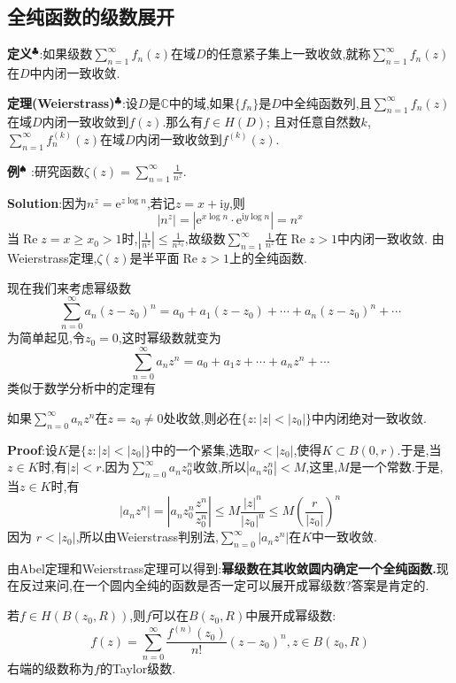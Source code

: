 \subsection{全纯函数的级数展开}
\textbf{定义}$^\clubsuit$:如果级数$\sum^{\infty}_{n=1}f_n(z)$在域$D$的任意紧子集上一致收敛,就称$\sum^{\infty}_{n=1}f_n(z)$在$D$中内闭一致收敛.\par
\textbf{定理(Weierstrass)}$^\clubsuit$:设$D$是$\mathbb{C}$中的域,如果$\{f_n\}$是$D$中全纯函数列,且$\sum^{\infty}_{n=1}f_n(z)$在域$D$内闭一致收敛到$f(z)$.那么有$f\in H(D)$;
且对任意自然数$k$,$\sum^{\infty}_{n=1}f_n^{(k)}(z)$在域$D$内闭一致收敛到$f^{(k)}(z)$.\par
\textbf{例}$^\spadesuit$ :研究函数$\zeta(z)=\sum_{n=1}^{\infty}\frac{1}{n^{z}}$.\par 
\textbf{Solution}:因为$n^z=\mathrm{e}^{z\log n}$,若记$z=x+\mathrm{i}y$,则
$$
|n^{z}|=|\mathrm{e}^{x\log n}\cdot\mathrm{e}^{\mathrm{i}y\log n}|=n^{x}
$$
当$\operatorname{Re}z=x\geqslant x_{0}>1$时,$\left|\frac{1}{n^{z}}\right|\leqslant\frac{1}{n^{x_{0}}}$,故级数$\sum_{n=1}^{\infty}\frac{1}{n^{z}}$在$\operatorname{Re}z>1$中内闭一致收敛.
由Weierstrass定理,$\zeta(z)$是半平面$\operatorname{Re}z>1$上的全纯函数.\par
现在我们来考虑幂级数
$$
\sum^{\infty}_{n=0}a_n(z-z_0)^n=a_0+a_1(z-z_0)+\cdots+a_n(z-z_0)^n+\cdots
$$
为简单起见,令$z_0=0$,这时幂级数就变为
$$
\sum^{\infty}_{n=0}a_n z^n=a_0+a_1 z+\cdots+a_n z^n+\cdots
$$
类似于数学分析中的定理有
\begin{tcolorbox}[colback=KuangNei,colframe=BianKuang,title=\textbf{Abel},sharpish corners]
    如果$\sum^{\infty}_{n=0}a_n z^n$在$z=z_0\neq 0$处收敛,则必在$\{z:|z|<|z_0|\}$中内闭绝对一致收敛.
\end{tcolorbox}
\textbf{Proof}:设$K$是$\{z:|z|<|z_0|\}$中的一个紧集,选取$r<|z_0|$,使得$K\subset B(0,r)$.于是,当$z\in K$时,有$|z|<r$.因为$\sum_{n=0}^{\infty}a_nz_0^n$收敛,所以$|a_nz_0^n|<M$,这里,$M$是一个常数.于是,当$z\in K$时,有
$$
|a_nz^n|=\left|a_nz_0^n\frac{z^n}{z_0^n}\right|\leqslant M\frac{|z|^n}{|z_0|^n}\leqslant M\left(\frac r{|z_0|}\right)^n
$$
因为 $r<|z_0|$,所以由Weierstrass判别法,$\sum_{n=0}^{\infty}|a_nz^n|$在$K$中一致收敛.\par
由Abel定理和Weierstrass定理可以得到:\textbf{幂级数在其收敛圆内确定一个全纯函数.}现在反过来问,在一个圆内全纯的函数是否一定可以展开成幂级数?答案是肯定的.
\begin{tcolorbox}[colback=KuangNei,colframe=BianKuang,title=\textbf{全纯函数的Taylor展开},sharpish corners]
若$f\in H(B(z_0,R))$,则$f$可以在$B(z_0,R)$中展开成幂级数:
\begin{equation}
    f(z)=\sum_{n=0}^{\infty}\frac{f^{(n)}(z_0)}{n!}(z-z_0)^n, z\in B(z_0,R) \label{eq:4.3.1}
\end{equation}
右端的级数称为$f$的Taylor级数.
\end{tcolorbox}
